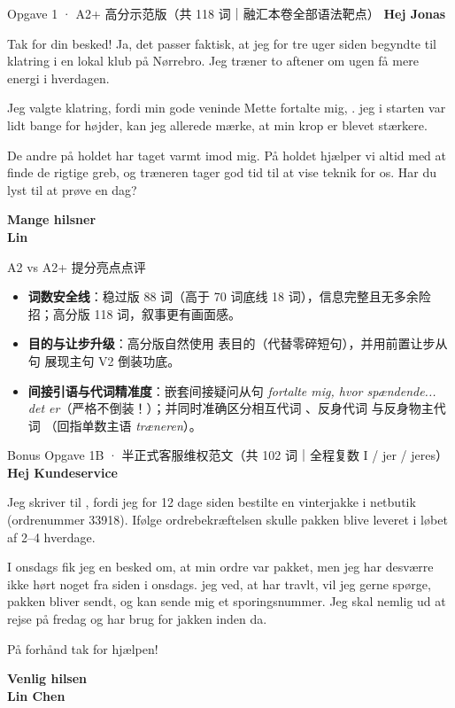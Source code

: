\begin{emailbox}{Opgave 1 · A2+ 高分示范版（共 118 词｜融汇本卷全部语法靶点）}
\textbf{Hej Jonas}

Tak for din besked! Ja, det passer faktisk, at jeg for tre uger siden begyndte til klatring i en lokal klub på Nørrebro. Jeg træner to aftener om ugen  få mere energi i hverdagen.

Jeg valgte klatring, fordi min gode veninde Mette fortalte mig,  .  jeg i starten var lidt bange for højder, kan jeg allerede mærke, at min krop er blevet stærkere.

De andre på holdet har taget varmt imod mig. På holdet hjælper vi altid  med at finde de rigtige greb, og træneren tager  god tid til at vise  teknik for os. Har du lyst til at prøve en dag?

\textbf{Mange hilsner}\\
\textbf{Lin}
\end{emailbox}

\begin{tipbox}{A2 vs A2+ 提分亮点点评}
\small
\begin{itemize}
  \item \textbf{词数安全线}：稳过版 88 词（高于 70 词底线 18 词），信息完整且无多余险招；高分版 118 词，叙事更有画面感。
  \item \textbf{目的与让步升级}：高分版自然使用  表目的（代替零碎短句），并用前置让步从句  展现主句 V2 倒装功底。
  \item \textbf{间接引语与代词精准度}：嵌套间接疑问从句 \textit{fortalte mig, hvor spændende... det er}（严格不倒装！）；并同时准确区分相互代词 、反身代词  与反身物主代词 （回指单数主语 \textit{træneren}）。
\end{itemize}
\end{tipbox}

\begin{emailbox}{Bonus Opgave 1B · 半正式客服维权范文（共 102 词｜全程复数 I / jer / jeres）}
\textbf{Hej Kundeservice}

Jeg skriver til , fordi jeg for 12 dage siden bestilte en vinterjakke i  netbutik (ordrenummer 33918). Ifølge ordrebekræftelsen skulle pakken blive leveret i løbet af 2--4 hverdage.

I onsdags fik jeg en besked om, at min ordre var pakket, men jeg har desværre ikke hørt noget fra  siden i onsdags.  jeg ved, at  har travlt, vil jeg gerne spørge,  pakken bliver sendt, og   kan sende mig et sporingsnummer. Jeg skal nemlig ud at rejse på fredag og har brug for jakken inden da.

På forhånd tak for hjælpen!

\textbf{Venlig hilsen}\\
\textbf{Lin Chen}
\end{emailbox}


